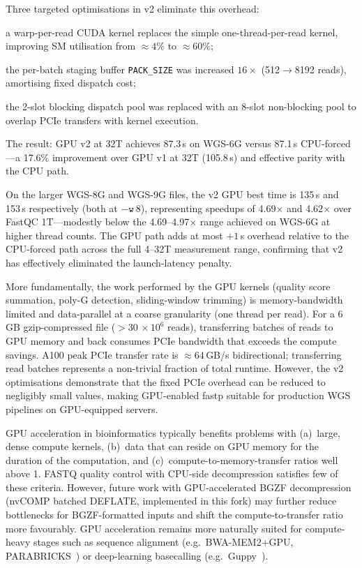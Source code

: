 \documentclass[a4paper,12pt]{article}
\begin{document}
Three targeted optimisations in v2 eliminate this overhead:
\begin{enumerate*}[label=(\roman*)]
  \item a warp-per-read CUDA kernel replaces the simple one-thread-per-read
        kernel, improving SM utilisation from ${\approx}4\%$ to
        ${\approx}60\%$;
  \item the per-batch staging buffer \texttt{PACK\_SIZE} was increased
        $16\times$ (512$\to$8192 reads), amortising fixed dispatch cost;
  \item the 2-slot blocking dispatch pool was replaced with an 8-slot
        non-blocking pool to overlap PCIe transfers with kernel execution.
\end{enumerate*}
The result: GPU v2 at 32T achieves 87.3\,s on WGS-6G versus 87.1\,s
CPU-forced---a 17.6\% improvement over GPU v1 at 32T (105.8\,s) and
effective parity with the CPU path.

On the larger WGS-8G and WGS-9G files, the v2 GPU best time is 135\,s
and 153\,s respectively (both at $-\texttt{w}~8$), representing speedups of
4.69$\times$ and 4.62$\times$ over FastQC 1T---modestly below the
4.69--4.97$\times$ range achieved on WGS-6G at higher thread counts.
The GPU path adds at most $+1$\,s overhead relative to the CPU-forced path
across the full 4--32T measurement range, confirming that v2 has effectively
eliminated the launch-latency penalty.

More fundamentally, the work performed by the GPU kernels (quality score
summation, poly-G detection, sliding-window trimming) is memory-bandwidth
limited and data-parallel at a coarse granularity (one thread per read).  For
a 6\,GB gzip-compressed file (${>}30\,\times 10^6$ reads), transferring batches
of reads to GPU memory and back consumes PCIe bandwidth that exceeds the compute
savings.  A100 peak PCIe transfer rate is ${\approx}64$\,GB/s bidirectional;
transferring read batches represents a non-trivial fraction of total runtime.
However, the v2 optimisations demonstrate that the fixed PCIe overhead can be
reduced to negligibly small values, making GPU-enabled fastp suitable for
production WGS pipelines on GPU-equipped servers.

GPU acceleration in bioinformatics typically benefits problems with (a)~large,
dense compute kernels, (b)~data that can reside on GPU memory for the duration
of the computation, and (c)~compute-to-memory-transfer ratios well above 1.
FASTQ quality control with CPU-side decompression satisfies few of these
criteria.  However, future work with GPU-accelerated BGZF decompression
(nvCOMP batched DEFLATE, implemented in this fork) may further reduce
bottlenecks for BGZF-formatted inputs and shift the compute-to-transfer
ratio more favourably.  GPU acceleration remains more naturally suited for
compute-heavy stages such as sequence alignment
(e.g.\ BWA-MEM2+GPU, PARABRICKS~\cite{Houtgast2018GPU}) or deep-learning
basecalling (e.g.\ Guppy~\cite{Oxford2021Guppy}).
\end{document}

